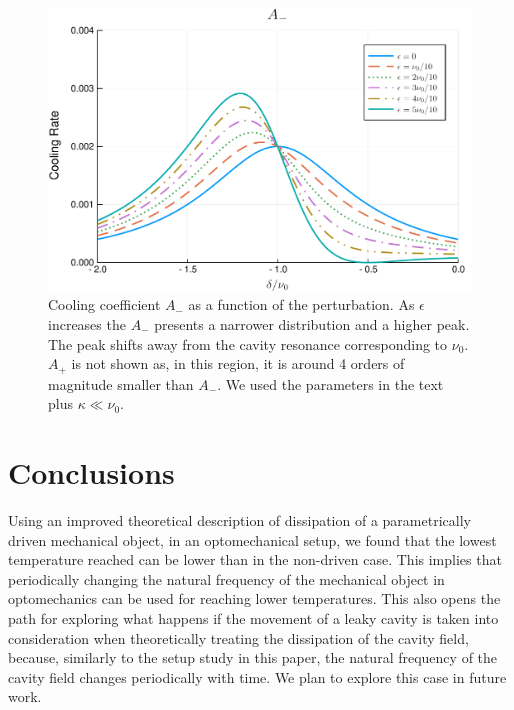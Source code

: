 \documentclass[reprint, amsmath,amssymb, aps,pra]{revtex4-1}
\begin{document}
\begin{figure}
\includegraphics[scale=.4]{GraficaA-.pdf}
\caption{Cooling coefficient $A_-$ as a function of the perturbation.
  As $\epsilon$ increases the $A_-$ presents a narrower distribution
  and a higher peak. The peak shifts away from the cavity resonance
  corresponding to $\nu_0$. $A_+$ is not shown as, in this region, it
  is around 4 orders of magnitude smaller than $A_-$. We used the
  parameters in the text plus $\kappa \ll \nu_0$.}
\label{GraficaA-}
\end{figure}








\section{Conclusions}\label{ConCl}

Using an improved theoretical description of dissipation of a
parametrically driven mechanical object, in an optomechanical setup,
we found that the lowest temperature reached can be lower than in the
non-driven case. This implies that periodically changing the natural
frequency of the mechanical object in optomechanics can be used for
reaching lower temperatures. This also opens the path for exploring
what happens if the movement of a leaky cavity is taken into
consideration when theoretically treating the dissipation of the
cavity field, because, similarly to the setup study in this paper, the
natural frequency of the cavity field changes periodically with time.
We plan to explore this case in future work.
 
\end{document}
